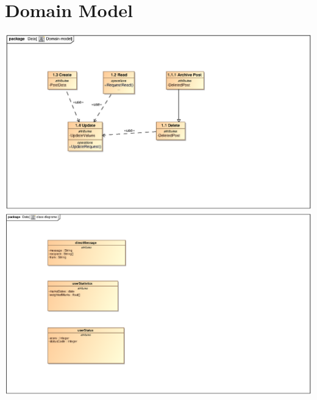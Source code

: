 \documentclass{scrreprt}
\begin{document}
\chapter{Domain Model}   								%
\includegraphics[scale=.9]{CRUDDomainModel.eps}\\
\includegraphics[scale=.9]{seanDM.eps}			
\end{document}
